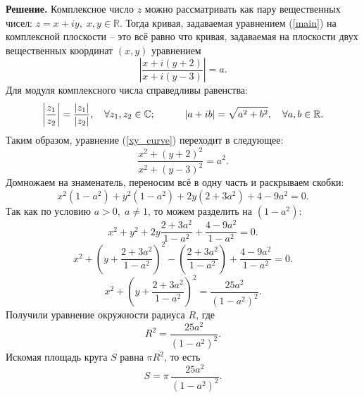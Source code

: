 \documentclass[12pt]{article}
\begin{document}
\noindent\textbf{Решение.} 
Комплексное число $z$ можно рассматривать как пару вещественных чисел: $z = x + iy, \;x,y \in \mathbb{R}$. Тогда кривая, задаваемая уравнением (\ref{main}) на комплексной плоскости -- это всё равно что кривая, задаваемая на плоскости двух вещественных координат $(x,y)$ уравнением
\begin{equation}\label{xy_curve}
    \left|\frac{x+i(y+2)}{x+i(y-3)}\right| = a.
\end{equation}
Для модуля комплексного числа справедливы равенства:
\begin{equation*}
    \left|\frac{z_1}{z_2}\right| = \frac{|z_1|}{|z_2|}, \quad\forall z_1, z_2 \in \mathbb{C};\vspace{2mm} \quad\quad\quad
    |a+ib|=\sqrt{a^2+b^2}, \quad\forall a,b\in\mathbb{R}.
\end{equation*}
Таким образом, уравнение (\ref{xy_curve}) переходит в следующее:
\begin{equation*}
    \frac{x^2+(y+2)^2}{x^2+(y-3)^2} = a^2.
\end{equation*}
Домножаем на знаменатель, переносим всё в одну часть и раскрываем скобки:
\begin{equation*}
    x^2(1-a^2)+y^2(1-a^2)+2y(2+3a^2)+4-9a^2=0.
\end{equation*}
Так как по условию $a > 0, \; a \neq 1$, то можем разделить на $(1-a^2):$
\begin{equation*}
    x^2 + y^2 +2y\frac{2+3a^2}{1-a^2}+ \frac{4-9a^2}{1-a^2} = 0.
\end{equation*}
\begin{equation*}
    x^2 + \left(y+\frac{2+3a^2}{1-a^2}\right)^2 - \left(\frac{2+3a^2}{1-a^2}\right) + \frac{4-9a^2}{1-a^2} = 0.
\end{equation*}
\begin{equation*}
    x^2 + \left(y+\frac{2+3a^2}{1-a^2}\right)^2 = \frac{25a^2}{(1-a^2)^2}.
\end{equation*}
Получили уравнение окружности радиуса $R$, где 
\begin{equation*}
    R^2 = \frac{25a^2}{(1-a^2)^2}.
\end{equation*}
Искомая площадь круга $S$ равна $\pi R^2$, то есть
\begin{equation*}
    S = \pi\,\frac{25a^2}{(1-a^2)^2}.
\end{equation*}
\end{document}
